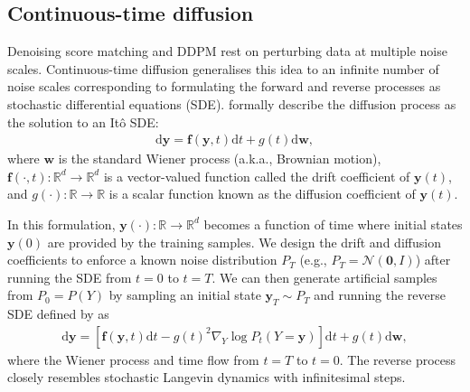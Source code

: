 \subsection{Continuous-time diffusion}
Denoising score matching and DDPM rest on perturbing data at multiple noise scales. Continuous-time diffusion generalises this idea to an infinite number of noise scales corresponding to formulating the forward and reverse processes as stochastic differential equations (SDE). \citet{song2020score} formally describe the diffusion process as the solution to an It{\^o} SDE:
\begin{align}
  \text{d}\bm{y} = \bm{f}(\bm{y}, t) \text{d}t + g(t) \text{d}\bm{w}, \label{eq:continuous_diffusion}
\end{align}
where $\bm{w}$ is the standard Wiener process (a.k.a., Brownian motion), $\bm{f}(\cdot, t): \mathbb{R}^d \rightarrow \mathbb{R}^d$ is a vector-valued function called the drift coefficient of $\bm{y}(t)$, and $g(\cdot): \mathbb{R} \rightarrow \mathbb{R}$ is a scalar function known as
the diffusion coefficient of $\bm{y}(t)$.

In this formulation, $\bm{y}(\cdot): \mathbb{R} \rightarrow \mathbb{R}^d$ becomes a function of time where initial states $\bm{y}(0)$ are provided by the training samples. We design the drift and diffusion coefficients to enforce a known noise distribution $P_T$ (e.g., $P_T = \mathcal{N}(\bm 0, I)$) after running the SDE from $t=0$ to $t=T$. We can then generate artificial samples from $P_0 = P(Y)$ by sampling an initial state $\bm{y}_T \sim P_T$ and running the reverse SDE defined by \citet{anderson1982reverse} as
\begin{align}
  \text{d}\bm{y} = \left[ \bm{f}(\bm{y}, t) \text{d}t - g(t)^2 \nabla_Y \log P_t(Y=\bm{y}) \right] \text{d}t + g(t) \text{d}\bm{w},\label{eq:continuous_reverse_diffusion}
\end{align}
where the Wiener process and time flow from $t=T$ to $t=0$. The reverse process closely resembles stochastic Langevin dynamics with infinitesimal steps.

